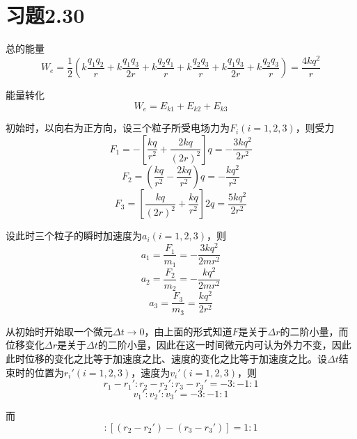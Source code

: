 \documentclass{SCIS2020cn}
\begin{document}
\section{习题2.30}
总的能量
\begin{equation}
    W_e=\frac{1}{2}\left(k\frac{q_1q_2}{r}+k\frac{q_1q_3}{2r}+k\frac{q_2q_1}{r}+k\frac{q_2q_3}{r}+k\frac{q_1q_3}{2r}+k\frac{q_2q_3}{r}\right)=\frac{4kq^2}{r}
\end{equation}

能量转化
\begin{equation}
    W_e=E_{k1}+E_{k2}+E_{k3}
\end{equation}

初始时，以向右为正方向，设三个粒子所受电场力为$F_i(i=1,2,3)$，则受力
\begin{equation}
    F_1=-\left[\frac{kq}{r^2}+\frac{2kq}{(2r)^2}\right]q=-\frac{3kq^2}{2r^2}
\end{equation}
\begin{equation}
    F_2=\left(\frac{kq}{r^2}-\frac{2kq}{r^2}\right)q=-\frac{kq^2}{r^2}
\end{equation}
\begin{equation}
    F_3=\left[\frac{kq}{(2r)^2}+\frac{kq}{r^2}\right]2q=\frac{5kq^2}{2r^2}
\end{equation}

设此时三个粒子的瞬时加速度为$a_i(i=1,2,3)$，则
\begin{equation}
    a_1=\frac{F_1}{m_1}=-\frac{3kq^2}{2mr^2}
\end{equation}
\begin{equation}
    a_2=\frac{F_2}{m_2}=-\frac{kq^2}{2mr^2}
\end{equation}
\begin{equation}
    a_3=\frac{F_3}{m_3}=\frac{kq^2}{2r^2}
\end{equation}

从初始时开始取一个微元$\Delta{}t\rightarrow0$，由上面的形式知道$F$是关于$\Delta{}r$的二阶小量，而位移变化$\Delta{r}$是关于$\Delta{}t$的二阶小量，因此在这一时间微元内可认为外力不变，因此此时位移的变化之比等于加速度之比、速度的变化之比等于加速度之比。设$\Delta{t}$结束时的位置为$r_i'(i=1,2,3)$，速度为$v_i'(i=1,2,3)$，则
\begin{equation}
    r_1-r_1':r_2-r_2':r_3-r_3'=-3:-1:1
\end{equation}
\begin{equation}
    v_1':v_2':v_3'=-3:-1:1
\end{equation}

而
\begin{equation}
    [(r_1-r_1')-(r_2-r_2')]:[(r_2-r_2')-(r_3-r_3')]=1:1
\end{equation}
\end{document}
